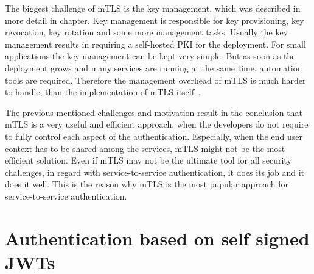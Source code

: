The biggest challenge of mTLS is the key management, which was described in more detail in chapter.
Key management is responsible for key provisioning, key revocation, key rotation and some more management tasks.
Usually the key management results in requiring a self-hosted PKI for the deployment.
For small applications the key management can be kept very simple.
But as soon as the deployment grows and many services are running at the same time, automation tools are required.
Therefore the management overhead of mTLS is much harder to handle, than the implementation of mTLS itself~\cite{dias2020microservices}.

The previous mentioned challenges and motivation result in the conclusion that mTLS is a very useful and efficient approach, when the developers do not require to fully control each aspect of the authentication.
Especially, when the end user context has to be shared among the services, mTLS might not be the most efficient solution.
Even if mTLS may not be the ultimate tool for all security challenges, in regard with service-to-service authentication, it does its job and it does it well.
This is the reason why mTLS is the most pupular approach for service-to-service authentication.

\section{Authentication based on self signed JWTs}
